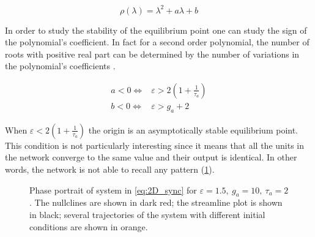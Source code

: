 \begin{equation}
\rho(\lambda) = \lambda^2 + a\lambda +b
\end{equation}

In order to study the stability of the equilibrium point one can study the sign of the polynomial's coefficient. In fact for a second order polynomial, the number of roots with positive real part can be determined by the number of variations in the polynomial's coefficients \cite{gantmacher2005matrix}.

\begin{equation}
\begin{aligned}
 a < 0 \iff & \varepsilon > 2(1 + \frac{1}{\tau_a}) \\
 b < 0 \iff & \varepsilon > g_a + 2
\end{aligned}
\end{equation}

When $\varepsilon<2(1+\frac{1}{\tau_a})$ the origin is an asymptotically stable equilibrium point. This condition is not particularly interesting since it means that all the units in the network converge to the same value and their output is identical. In other words, the network is not able to recall any pattern (\cref{fig:eq2D_focus}).

\begin{figure}[!h]
        \caption{\label{fig:eq2D_focus} Phase portrait of system in \eqref{eq:2D_sync} for $\varepsilon=1.5,\ g_a=10,\ \tau_a=2$. The nullclines are shown in dark red; the streamline plot is shown in black; several trajectories of the system with different initial conditions are shown in orange.}
\end{figure}


